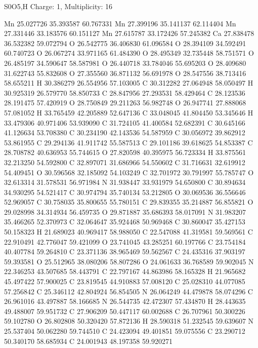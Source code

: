 \documentclass{article}
\begin{document}
S0O5,H    Charge: 1, Multiplicity: 16     
    
Mn 25.027726 35.393587 60.767331 
Mn 27.399196 35.141137 62.114404 
Mn 27.331446 33.183576 60.151127 
Mn 27.615787 33.172426 57.245382 
Ca 27.838478 36.532382 59.072794 
O 26.542775 36.406830 61.096584 
O 28.394109 34.592491 60.740723 
O 26.067274 33.971165 61.484390 
O 28.495349 32.735448 58.751571 
O 26.485197 34.590647 58.587981 
O 26.440718 33.784046 55.695203 
O 28.409680 31.622743 55.832608 
O 27.355560 36.871132 56.691978 
O 28.547556 38.713416 58.655211 
H 30.386279 26.554956 57.103005 
C 30.312282 27.064948 58.050497 
H 30.925319 26.579770 58.850733 
C 28.847956 27.293531 58.429464 
C 28.123536 28.191475 57.420919 
O 28.750849 29.211263 56.982748 
O 26.947741 27.888068 57.081052 
H 33.765459 42.205889 52.647136 
C 33.048045 41.804450 53.345646 
H 33.479306 40.971406 53.939090 
C 31.724105 41.400584 52.682391 
C 30.645166 41.126634 53.708380 
C 30.234190 42.143536 54.587959 
C 30.056972 39.862912 53.861955 
C 29.294136 41.911742 55.587513 
C 29.101186 39.618625 54.853387 
C 28.708782 40.636953 55.744615 
O 27.820598 40.395975 56.723334 
H 33.875561 32.213250 54.592800 
C 32.897071 31.686966 54.550602 
C 31.716631 32.619912 54.409451 
O 30.596568 32.185092 54.103249 
C 32.701972 30.791997 55.785747 
O 32.613314 31.578531 56.971984 
N 31.938447 33.931979 54.650800 
C 30.894634 34.930295 54.521417 
C 30.974794 35.740134 53.212805 
O 30.069536 36.556646 52.969057 
C 30.758035 35.800655 55.780151 
C 29.839355 35.214887 56.855821 
O 29.028998 34.314934 56.459735 
O 29.871887 35.686393 58.017091 
N 31.983207 35.466265 52.370973 
C 32.064647 35.924468 50.969468 
C 30.860047 35.427153 50.158323 
H 21.689023 40.969417 58.988050 
C 22.547088 41.319581 59.569561 
C 22.910491 42.776047 59.421099 
O 23.741045 43.285251 60.197766 
C 23.754184 40.407784 59.264810 
C 23.371136 38.965469 59.562567 
C 24.435316 37.903197 59.393581 
O 25.512965 38.080206 58.807286 
O 24.061633 36.768589 59.902045 
N 22.346253 43.507685 58.443791 
C 22.797167 44.863986 58.165328 
H 21.965682 45.497422 57.900025 
C 23.819545 44.910883 57.008120 
C 25.028310 44.077085 57.256842 
C 25.346112 42.804924 56.854505 
N 26.064249 44.479878 58.074296 
C 26.961016 43.497887 58.166685 
N 26.544735 42.472307 57.434870 
H 28.443635 49.488007 59.951732 
C 27.906209 50.447117 60.002688 
C 26.707961 50.300226 59.102780 
O 26.802808 50.320420 57.872136 
H 28.590318 51.232545 59.639607 
N 25.537404 50.062280 59.744510 
C 24.423094 49.401851 59.075556 
C 23.290712 50.340170 58.685934 
C 24.001943 48.197358 59.920271 
\end{document}
